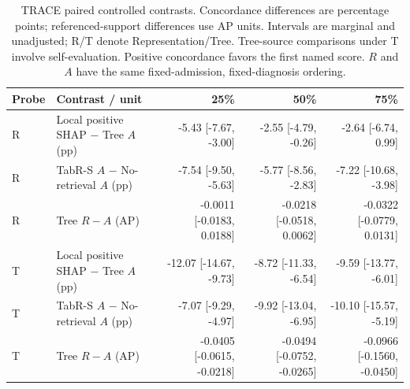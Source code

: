 \begin{table}[!tbp]\centering\scriptsize
\caption{TRACE paired controlled contrasts. Concordance differences are percentage points; referenced-support differences use AP units. Intervals are marginal and unadjusted; R/T denote Representation/Tree. Tree-source comparisons under T involve self-evaluation. Positive concordance favors the first named score. $R$ and $A$ have the same fixed-admission, fixed-diagnosis ordering.}\label{tab:trace-controlled-contrasts}
\setlength{\tabcolsep}{3pt}
\begin{tabular}{llrrr}\toprule
Probe & Contrast / unit & 25\% & 50\% & 75\% \\ \midrule
R & Local positive SHAP $-$ Tree $A$ (pp) & -5.43 [-7.67, -3.00] & -2.55 [-4.79, -0.26] & -2.64 [-6.74, 0.99] \\
R & TabR-S $A$ $-$ No-retrieval $A$ (pp) & -7.54 [-9.50, -5.63] & -5.77 [-8.56, -2.83] & -7.22 [-10.68, -3.98] \\
R & Tree $R-A$ (AP) & -0.0011 [-0.0183, 0.0188] & -0.0218 [-0.0518, 0.0062] & -0.0322 [-0.0779, 0.0131] \\
T & Local positive SHAP $-$ Tree $A$ (pp) & -12.07 [-14.67, -9.73] & -8.72 [-11.33, -6.54] & -9.59 [-13.77, -6.01] \\
T & TabR-S $A$ $-$ No-retrieval $A$ (pp) & -7.07 [-9.29, -4.97] & -9.92 [-13.04, -6.95] & -10.10 [-15.57, -5.19] \\
T & Tree $R-A$ (AP) & -0.0405 [-0.0615, -0.0218] & -0.0494 [-0.0752, -0.0265] & -0.0966 [-0.1560, -0.0450] \\
\bottomrule\end{tabular}
\end{table}
